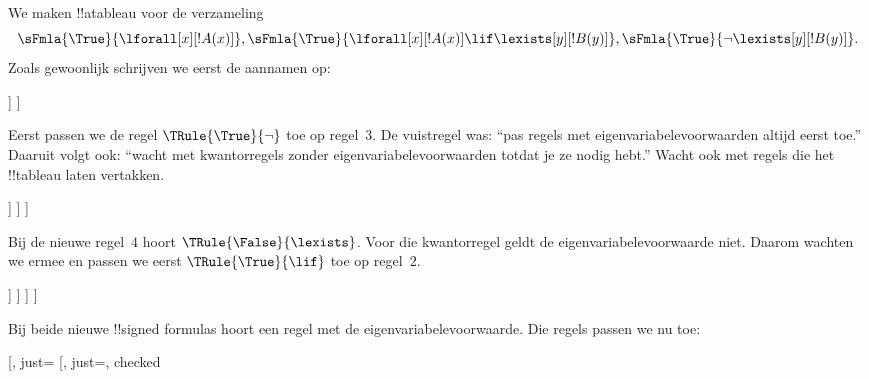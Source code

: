 \documentclass[../../../include/open-logic-section]{subfiles}
\begin{document}
\begin{ex}
We maken !!a{tableau} voor de verzameling
\[
\sFmla{\True}{\lforall[x][!A(x)]}, \sFmla{\True}{\lforall[x][!A(x)] 
  \lif \lexists[y][!B(y)]}, \sFmla{\True}{\lnot\lexists[y][!B(y)]}.
\]
Zoals gewoonlijk schrijven we eerst de aannamen op:
\begin{oltableau}
  [\sFmla{\True}{\lforall[x][\formula{A}(x)]}, just=\TAss
    [\sFmla{\True}{\lforall[x][\formula{A}(x)] \lif
        \lexists[y][\formula{B}(y)]}, just=\TAss
      [\sFmla{\True}{\lnot\lexists[y][\formula{B}(y)]}, just=\TAss
      ]
    ]
  ]
\end{oltableau}
Eerst passen we de regel $\TRule{\True}{\lnot}$ toe op regel~$3$. De
vuistregel was: ``pas regels met eigenvariabelevoorwaarden altijd eerst
toe.'' Daaruit volgt ook: ``wacht met kwantorregels zonder
eigenvariabelevoorwaarden totdat je ze nodig hebt.'' Wacht ook met
regels die het !!{tableau} laten vertakken.
\begin{oltableau}
  [\sFmla{\True}{\lforall[x][\formula{A}(x)]}, just=\TAss
    [\sFmla{\True}{\lforall[x][\formula{A}(x)] \lif
        \lexists[y][\formula{B}(y)]}, just=\TAss
      [\sFmla{\True}{\lnot\lexists[y][\formula{B}(y)]}, just=\TAss, checked
        [\sFmla{\False}{\lexists[y][\formula{B}(y)]}, just={\TRule{\True}{\lnot}[3]}]
      ]
    ]
  ]
\end{oltableau}
Bij de nieuwe regel~$4$ hoort $\TRule{\False}{\lexists}$. Voor die
kwantorregel geldt de eigenvariabelevoorwaarde niet. Daarom wachten we
ermee en passen we eerst $\TRule{\True}{\lif}$ toe op regel~$2$.
\begin{oltableau}
  [\sFmla{\True}{\lforall[x][\formula{A}(x)]}, just=\TAss
    [\sFmla{\True}{\lforall[x][\formula{A}(x)] \lif
        \lexists[y][\formula{B}(y)]}, just=\TAss, checked
      [\sFmla{\True}{\lnot\lexists[y][\formula{B}(y)]}, just=\TAss, checked
        [\sFmla{\False}{\lexists[y][\formula{B}(y)]},
          just={\TRule{\True}{\lnot}[3]},
          [\sFmla{\False}{\lforall[x][\formula{A}(x)]}, just={\TRule{\True}{\lif}[2]}]
          [\sFmla{\True}{\lexists[y][\formula{B}(y)]}, just={\TRule{\True}{\lif}[2]}]
        ]
      ]
    ]
  ]
\end{oltableau}
Bij beide nieuwe !!{signed formula}s hoort een regel met de
eigenvariabelevoorwaarde. Die regels passen we nu toe:
\begin{oltableau}
  [\sFmla{\True}{\lforall[x][\formula{A}(x)]}, just=\TAss
    [\sFmla{\True}{\lforall[x][\formula{A}(x)] \lif
        \lexists[y][\formula{B}(y)]}, just=\TAss, checked

\end{oltableau}
\end{ex}
\end{document}
